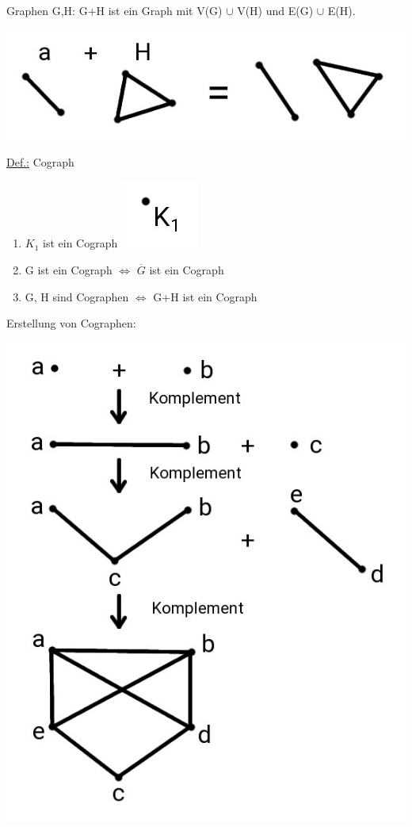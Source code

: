 Graphen G,H: G+H ist ein Graph mit V(G) $\cup$ V(H) und E(G) $\cup$ E(H).
\begin{center}
	\includegraphics[scale=0.5]{lectures/161202/pix/05.jpg}
\end{center}
\par\medskip
\underline{Def.:} Cograph
\begin{enumerate}
	\item $K_1$ ist ein Cograph \includegraphics[scale=0.25]{lectures/161202/pix/13.jpg}
	\item G ist ein Cograph $\Leftrightarrow$ $\overline{G}$ ist ein Cograph
	\item G, H sind Cographen $\Leftrightarrow$ G+H ist ein Cograph
\end{enumerate}
Erstellung von Cographen:
\begin{center}
	\includegraphics[scale=0.5]{lectures/161202/pix/06.jpg}
\end{center}
